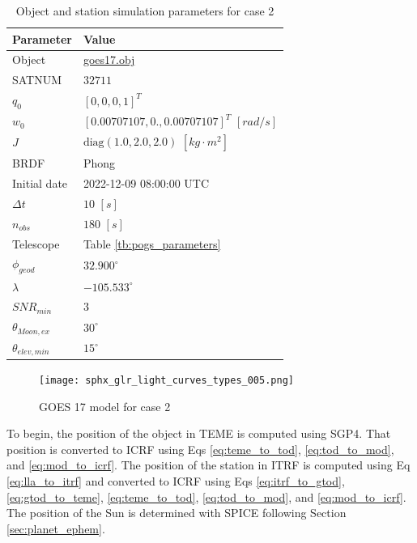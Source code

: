 \begin{table}[]
  \centering
  \begin{tabular}{|l|l|}
  \hline
  \textbf{Parameter} & \textbf{Value} \\ \hline
  Object & \href{https://raw.githubusercontent.com/liamrobinson1/Light-Curve-Models/main/accurate_sats/matlib_goes17.obj}{goes17.obj} \\ \hline
  SATNUM & $32711$ \\ \hline
  $q_0$ & $\left[ 0, 0, 0, 1 \right]^T$ \\ \hline
  $w_0$ & $\left[ 0.00707107, 0.,         0.00707107 \right]^T$ $[rad/s]$ \\ \hline
  $J$ & $\mathrm{diag}\left( 1.0, 2.0, 2.0 \right)$ $\left[ kg \cdot m^2 \right]$ \\ \hline
  BRDF & Phong \\ \hline
  Initial date & 2022-12-09 08:00:00 UTC \\ \hline
  $\Delta t$ & $10$ $[s]$ \\ \hline
  $n_{obs}$ & $180$ $[s]$ \\ \hline
  Telescope & Table \ref{tb:pogs_parameters} \\ \hline
  $\phi_{geod}$ & $32.900^\circ$ \\ \hline
  $\lambda$ & $-105.533^\circ$ \\ \hline
  $SNR_{min}$ & $3$ \\ \hline
  $\theta_{Moon,ex}$ & $30^\circ$ \\ \hline
  $\theta_{elev,min}$ & $15^\circ$ \\ \hline
  \end{tabular}
  \caption{Object and station simulation parameters for case 2}
  \label{tb:case2_obj_props}
\end{table}

\begin{figure}[!htb]
  \centering
  \texttt{[image: sphx\_glr\_light\_curves\_types\_005.png]}
  \caption{GOES 17 model for case 2}
  \label{fig:case2_obj}
\end{figure}

To begin, the position of the object in TEME is computed using SGP4. That position is converted to ICRF using Eqs \ref{eq:teme_to_tod}, \ref{eq:tod_to_mod}, and \ref{eq:mod_to_icrf}. The position of the station in ITRF is computed using Eq \ref{eq:lla_to_itrf} and converted to ICRF using Eqs \ref{eq:itrf_to_gtod}, \ref{eq:gtod_to_teme}, \ref{eq:teme_to_tod}, \ref{eq:tod_to_mod}, and \ref{eq:mod_to_icrf}. The position of the Sun is determined with SPICE following Section \ref{sec:planet_ephem}. 

